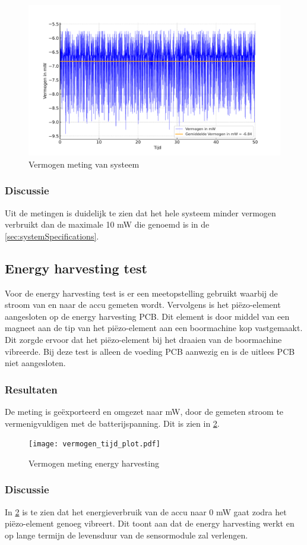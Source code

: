 \begin{figure}[ht]
    \centering
    \includegraphics[width=\textwidth]{img/vermogensMeting.pdf}
    \caption{Vermogen meting van systeem}
    \label{fig:vermogenMeting}
\end{figure}

\subsubsection{Discussie}
Uit de metingen is duidelijk te zien dat het hele systeem minder vermogen verbruikt dan de maximale 10 mW die genoemd is in de \cref{sec:systemSpecifications}. 


\subsection{Energy harvesting test}
Voor de energy harvesting test is er een meetopstelling gebruikt waarbij de stroom van en naar de accu gemeten wordt. Vervolgens is het piëzo-element aangesloten op de energy harvesting PCB. Dit element is door middel van een magneet aan de tip van het piëzo-element aan een boormachine kop vastgemaakt. Dit zorgde ervoor dat het piëzo-element bij het draaien van de boormachine vibreerde. Bij deze test is alleen de voeding PCB aanwezig en is de uitlees PCB niet aangesloten.

\subsubsection{Resultaten}
De meting is geëxporteerd en omgezet naar mW, door de gemeten stroom te vermenigvuldigen met de batterijspanning. Dit is zien in \cref{fig:vermogenPlot}.

\begin{figure}[ht]
    \centering
    \texttt{[image: vermogen\_tijd\_plot.pdf]}
    \caption{Vermogen meting energy harvesting}
    \label{fig:vermogenPlot}
\end{figure}

\subsubsection{Discussie}
In \cref{fig:vermogenPlot} is te zien dat het energieverbruik van de accu naar 0 mW gaat zodra het piëzo-element genoeg vibreert. Dit toont aan dat de energy harvesting werkt en op lange termijn de levensduur van de sensormodule zal verlengen.